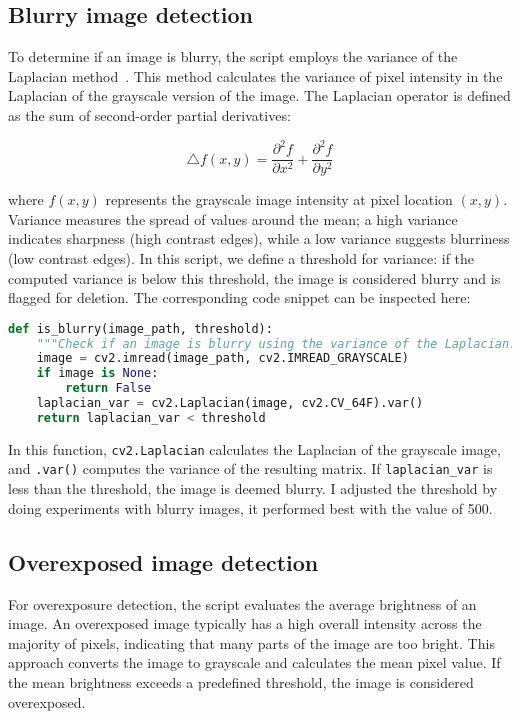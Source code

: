\subsection{Blurry image detection}
To determine if an image is blurry, the script employs the variance of the Laplacian method~\cite{blur_detection}. This method calculates the variance of pixel intensity in the Laplacian of the grayscale version of the image. The Laplacian operator is defined as the sum of second-order partial derivatives:

\begin{equation}
 \triangle \mathit{f}\left (x,y  \right )= \frac{\partial^2 f }{\partial x^2} + \frac{\partial^2 f }{\partial y^2}
\end{equation}

where \(f(x,y)\) represents the grayscale image intensity at pixel location \((x,y)\). Variance measures the spread of values around the mean; a high variance indicates sharpness (high contrast edges), while a low variance suggests blurriness (low contrast edges). In this script, we define a threshold for variance: if the computed variance is below this threshold, the image is considered blurry and is flagged for deletion. 
The corresponding code snippet can be inspected here:

\FloatBarrier
\begin{lstlisting}[language=python,frame=single,float=!ht]
def is_blurry(image_path, threshold):
    """Check if an image is blurry using the variance of the Laplacian."""
    image = cv2.imread(image_path, cv2.IMREAD_GRAYSCALE)
    if image is None:
        return False
    laplacian_var = cv2.Laplacian(image, cv2.CV_64F).var()
    return laplacian_var < threshold
\end{lstlisting}
\FloatBarrier

In this function, \verb|cv2.Laplacian| calculates the Laplacian of the grayscale image, and \verb|.var()| computes the variance of the resulting matrix. If \verb|laplacian_var| is less than the threshold, the image is deemed blurry. I adjusted the threshold by doing experiments with blurry images, it performed best with the value of 500.

\subsection{Overexposed image detection}

For overexposure detection, the script evaluates the average brightness of an image. An overexposed image typically has a high overall intensity across the majority of pixels, indicating that many parts of the image are too bright. This approach converts the image to grayscale and calculates the mean pixel value. If the mean brightness exceeds a predefined threshold, the image is considered overexposed.

